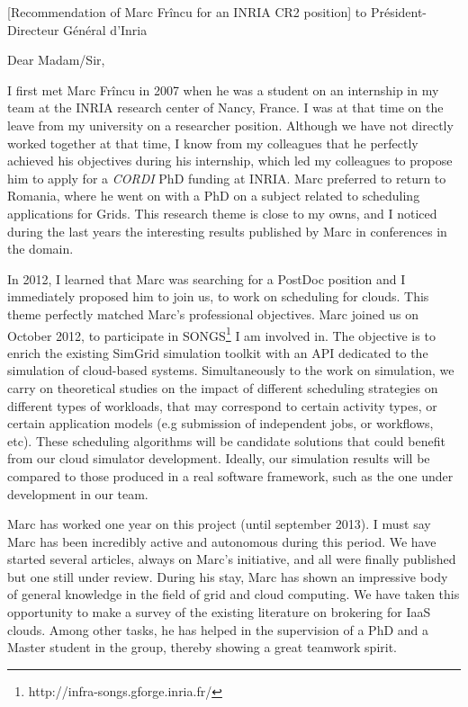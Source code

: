 \documentclass[a4paper,10pt]{article}
\begin{document}

\begin{letter}[Recommendation of Marc Fr\^incu for an INRIA CR2 position]
{to}
{Président-Directeur Général d’Inria}

Dear Madam/Sir, 

I first met Marc  Fr\^incu in 2007 when he was a student  on an internship in my
team at the  INRIA research center of Nancy,  France. I was at that  time on the
leave from my university on a researcher position. Although we have not directly
worked  together at  that time,  I  know from  my colleagues  that he  perfectly
achieved  his objectives  during  his  internship, which  led  my colleagues  to
propose him to apply for a \emph{CORDI}  PhD funding at INRIA. Marc preferred to
return  to Romania,  where  he  went on  with  a PhD  on  a  subject related  to
scheduling applications for Grids. This research  theme is close to my owns, and
I noticed  during the last  years the interesting  results published by  Marc in
conferences in the domain.

In  2012, I  learned  that Marc  was  searching  for a  PostDoc  position and  I
immediately proposed  him to  join us,  to work on  scheduling for  clouds. This
theme  perfectly  matched Marc's  professional  objectives.  Marc joined  us  on
October     2012,     to     participate     in   
SONGS\footnote{http://infra-songs.gforge.inria.fr/}  I  am   involved  in.   The
objective  is to  enrich the  existing SimGrid  simulation toolkit  with an  API
dedicated to the  simulation of cloud-based systems. Simultaneously  to the work
on  simulation, we  carry  on theoretical  studies on  the  impact of  different
scheduling strategies  on different types  of workloads, that may  correspond to
certain  activity  types,  or  certain application  models  (e.g  submission  of
independent  jobs, or  workflows,  etc).  These  scheduling  algorithms will  be
candidate solutions  that could  benefit from  our cloud  simulator development.
Ideally, our  simulation results will  be compared to  those produced in  a real
software framework, such as the one under development in our team.

Marc has worked one year on this project (until september 2013). I must say Marc
has been  incredibly active and autonomous  during this period. We  have started
several articles,  always on Marc's  initiative, and all were  finally published
but one still under  review. During his stay, Marc has  shown an impressive body
of general  knowledge in the  field of grid and  cloud computing. We  have taken
this opportunity  to make a survey  of the existing literature  on brokering for
IaaS clouds.  Among other tasks, he has helped in the supervision of a PhD and a
Master student in the group, thereby showing a great teamwork spirit.



\end{letter}
\end{document}
